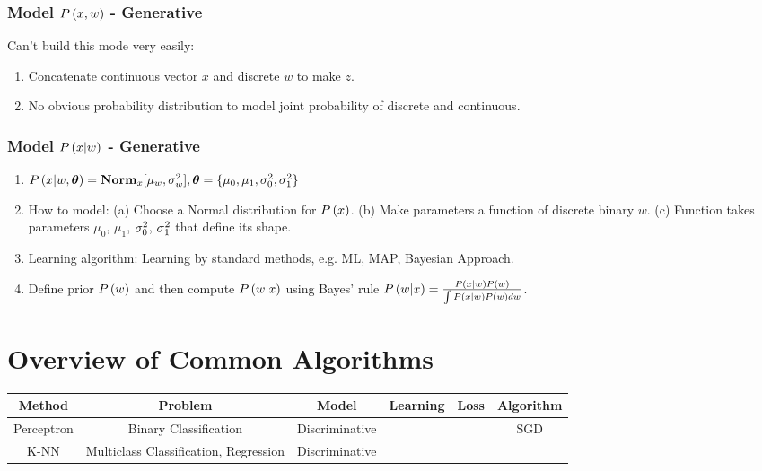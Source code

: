 \subsubsection*{Model $\P{x,w}$ - Generative}
Can't build this mode very easily:
	\begin{enumerate}
		\item Concatenate continuous vector $x$ and discrete $w$ to make $z$.
		\item No obvious probability distribution to model joint probability of discrete and continuous.
	\end{enumerate}

\subsubsection*{Model $\P{x|w}$ - Generative}
	\begin{enumerate}
		\item $\P{x|w,\vec{\th}}=\Norm_x[\mu_w,\si_w^2], \vec{\th}=\{\mu_0,\mu_1,\si_0^2,\si_1^2\}$
		\item How to model: (a) Choose a Normal distribution for $\P{x}$. (b) Make parameters a function of discrete binary $w$. (c) Function takes parameters $\mu_0$, $\mu_1$, $\si_0^2$, $\si_1^2$ that define its shape. 
		\item Learning algorithm: Learning by standard methods, e.g. ML, MAP, Bayesian Approach.
		\item Define prior $\P{w}$ and then compute $\P{w|x}$ using Bayes' rule $\P{w|x}=\frac{\P{x|w}\P{w}}{\int\P{x|w}\P{w}dw}$.
	\end{enumerate}

\section{Overview of Common Algorithms}

\begin{table*}[!h]
	\centering
	\begin{tabular}{|c|c|c|c|c|c|}
		\hline
		Method & Problem & Model & Learning & Loss & Algorithm \\
		\hline
		Perceptron & Binary Classification & Discriminative & & & SGD \\
		\hline
		K-NN & Multiclass Classification, Regression & Discriminative & & & \\
	\end{tabular}
\end{table*}